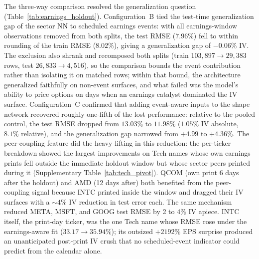 The three-way comparison resolved the generalization question (Table~\ref{tab:earnings_holdout}). Configuration~B tied the test-time generalization gap of the sector NN to scheduled earnings events: with all earnings-window observations removed from both splits, the test RMSE ($7.96\%$) fell to within rounding of the train RMSE ($8.02\%$), giving a generalization gap of $-0.06\%$ IV. The exclusion also shrank and recomposed both splits (train $103{,}897 \to 29{,}383$ rows, test $26{,}833 \to 4{,}516$), so the comparison bounds the event contribution rather than isolating it on matched rows; within that bound, the architecture generalized faithfully on non-event surfaces, and what failed was the model's ability to price options on days when an earnings catalyst dominated the IV surface. Configuration~C confirmed that adding event-aware inputs to the shape network recovered roughly one-fifth of the lost performance: relative to the pooled control, the test RMSE dropped from $13.03\%$ to $11.98\%$ ($1.05\%$ IV absolute, $8.1\%$ relative), and the generalization gap narrowed from $+4.99$ to $+4.36\%$. The peer-coupling feature did the heavy lifting in this reduction: the per-ticker breakdown showed the largest improvements on Tech names whose own earnings prints fell outside the immediate holdout window but whose sector peers printed during it (Supplementary Table~\ref{tab:tech_pivot}). QCOM (own print 6 days after the holdout) and AMD (12 days after) both benefited from the peer-coupling signal because INTC printed inside the window and dragged their IV surfaces with a $\sim 4\%$ IV reduction in test error each. The same mechanism reduced META, MSFT, and GOOG test RMSE by 2 to $4\%$ IV apiece. INTC itself, the print-day ticker, was the one Tech name whose RMSE rose under the earnings-aware fit ($33.17 \to 35.94\%$); its outsized $+2192\%$ EPS surprise produced an unanticipated post-print IV crush that no scheduled-event indicator could predict from the calendar alone.

